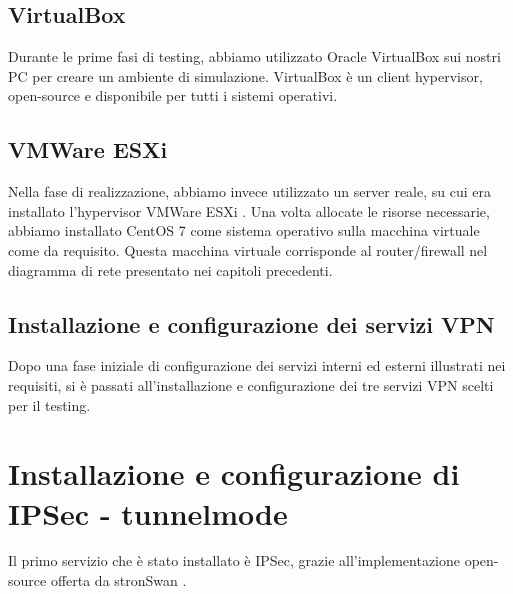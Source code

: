 \subsection{VirtualBox}
Durante le prime fasi di testing, abbiamo utilizzato Oracle VirtualBox \cite{virtualbox} sui nostri PC per creare un ambiente di simulazione. VirtualBox è un client hypervisor, open-source e disponibile per tutti i sistemi operativi.
\subsection{VMWare ESXi}
Nella fase di realizzazione, abbiamo invece utilizzato un server reale, su cui era installato l'hypervisor VMWare ESXi \cite{esxi}. Una volta allocate le risorse necessarie, abbiamo installato CentOS 7 come sistema operativo sulla macchina virtuale come da requisito.
Questa macchina virtuale corrisponde al router/firewall nel diagramma di rete presentato nei capitoli precedenti.

\subsection{Installazione e configurazione dei servizi VPN}
Dopo una fase iniziale di configurazione dei servizi interni ed esterni illustrati nei requisiti, si è passati all'installazione e configurazione dei tre servizi VPN scelti per il testing.

\section{Installazione e configurazione di IPSec - tunnelmode}
Il primo servizio che è stato installato è IPSec, grazie all'implementazione open-source offerta da stronSwan \cite{strongSwan}.


